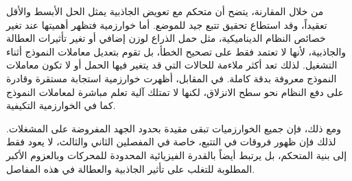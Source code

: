 \normalsize

من خلال المقارنة، يتضح أن متحكم  مع تعويض الجاذبية يمثل الحل الأبسط والأقل تعقيداً، وقد استطاع تحقيق تتبع جيد للموضع. أما خوارزمية  فتظهر أهميتها عند تغير خصائص النظام الديناميكية، مثل حمل الذراع لوزن إضافي أو تغير تأثيرات العطالة والجاذبية، لأنها لا تعتمد فقط على تصحيح الخطأ، بل تقوم بتعديل معاملات النموذج أثناء التشغيل. لذلك تعد  أكثر ملاءمة للحالات التي قد يتغير فيها الحمل أو لا تكون معاملات النموذج معروفة بدقة كاملة. في المقابل، أظهرت خوارزمية  استجابة مستقرة وقادرة على دفع النظام نحو سطح الانزلاق، لكنها لا تمتلك آلية تعلم مباشرة لمعاملات النموذج كما في الخوارزمية التكيفية.

ومع ذلك، فإن جميع الخوارزميات تبقى مقيدة بحدود الجهد المفروضة على المشغلات. لذلك فإن ظهور فروقات في التتبع، خاصة في المفصلين الثاني والثالث، لا يعود فقط إلى بنية المتحكم، بل يرتبط أيضاً بالقدرة الفيزيائية المحدودة للمحركات وبالعزوم الأكبر المطلوبة للتغلب على تأثير الجاذبية والعطالة في هذه المفاصل.








